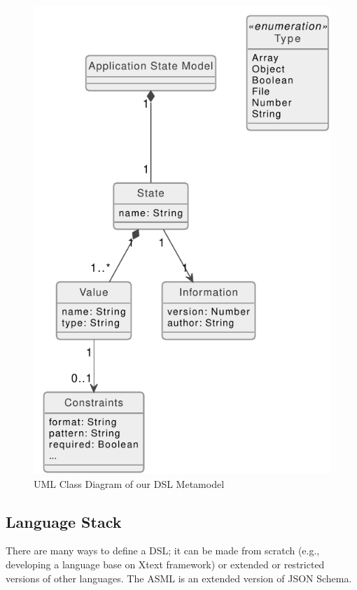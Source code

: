 \FloatBarrier
\begin{figure}
    \includegraphics[scale=1]{../figures/asml-class-diagram}
    \centering
    \caption{UML Class Diagram of our DSL Metamodel}
    \label{fig:asml-meta-model}
\end{figure}
\FloatBarrier

\subsection{Language Stack}
There are many ways to define a DSL; it can be made from scratch (e.g., developing a language base on Xtext framework) or extended or restricted versions of other languages. The ASML is an extended version of JSON Schema. 


